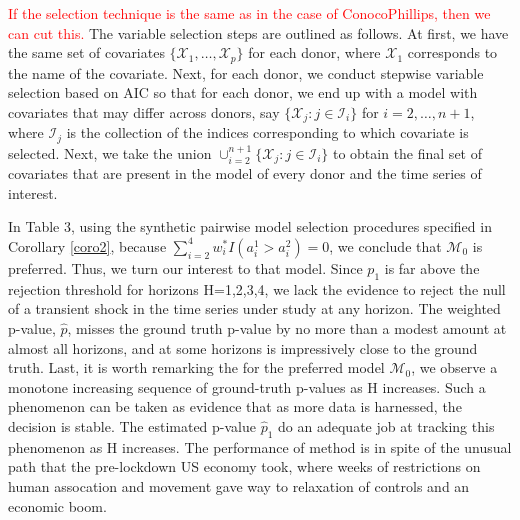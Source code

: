 \documentclass[11pt]{article}
\def\mc#1{\mathcal{#1}} %
\def\mc#1{\mathcal{#1}}
\theoremstyle{definition}
\begin{document}
\textcolor{red}{If the selection technique is the same as in the case of ConocoPhillips, then we can cut this.} The variable selection steps are outlined as follows. At first, we have the same set of covariates $\{\mc{X}_1, \ldots, \mc{X}_p\}$ for each donor, where $\mc{X}_1$ corresponds to the name of the covariate. Next, for each donor, we conduct stepwise variable selection based on AIC so that for each donor, we end up with a model with covariates that may differ across  donors, say $\{\mc{X}_j \colon j\in \mc{I}_i\}$ for $i = 2, \ldots, n+1$, where $\mc{I}_j$ is the collection of the indices corresponding to which covariate is selected. Next, we  take the union $\cup_{i=2}^{n+1}\{\mc{X}_j \colon j\in \mc{I}_i\}$ to obtain the final set of covariates that are present in the model of every donor and the time series of interest.

In Table 3, using the synthetic pairwise model selection procedures specified in Corollary \ref{coro2}, because $\sum_{i=2}^4 w_i^* I(a_i^1 > a_i^2) = 0$,  we conclude that  $\mc{M}_{0}$ is preferred. Thus, we turn our interest to that model.  Since $p_{1}$ is far above the rejection threshold for horizons H=1,2,3,4, we lack the evidence to reject the null of a transient shock in the time series under study at any horizon.  The weighted p-value, $\hat p $, misses the ground truth p-value by no more than a modest amount at almost all horizons, and at some horizons is impressively close to the ground truth.  Last, it is worth remarking the for the preferred model $\mc{M}_{0}$, we observe a monotone increasing sequence of ground-truth p-values as H increases.  Such a phenomenon can be taken as evidence that as more data is harnessed, the decision is stable.  The estimated p-value $\hat p_{1}$ do an adequate job at tracking this phenomenon as H increases.  The performance of method is in spite of the unusual path that the pre-lockdown US economy took, where weeks of restrictions on human assocation and movement gave way to relaxation of controls and an economic boom.  
\end{document}
